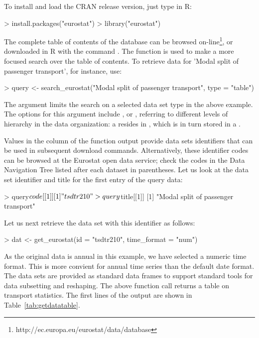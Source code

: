 To install and load the CRAN release version, just type in R:

\begin{example}
> install.packages("eurostat")
> library("eurostat")
\end{example}

The complete table of contents of the database can be browsed
on-line\footnote{http://ec.europa.eu/eurostat/data/database}, or
downloaded in R with the command . The function  is used
to make a more focused search over the table of contents. To retrieve
data for 'Modal split of passenger transport', for instance, use:

\begin{example}
> query <- search_eurostat("Modal split of passenger transport", type = "table")
\end{example}

The  argument limits the search on a selected data set type
in the above example. The options for this argument
include ,  or , referring to
different levels of hierarchy in the data organization: a 
resides in , which is in turn stored in a
.

Values in the  column of the 
function output provide data sets identifiers that can be used in
subsequent download commands. Alternatively, these identifier codes
can be browsed at the Eurostat open data service; check the codes in
the Data Navigation Tree listed after each dataset in parentheses. Let
us look at the data set identifier and title for the first entry of
the query data:

\begin{example}
> query$code[[1]]
[1] "tsdtr210"

> query$title[[1]]
[1] "Modal split of passenger transport"
\end{example}


Let us next retrieve the data set with this identifier as follows:

\begin{example}
> dat <- get_eurostat(id = "tsdtr210", time_format = "num")
\end{example}

As the original data is annual in this example, we have selected a
numeric time format. This is more convient for annual time series than
the default date format. The data sets are provided as standard data
frames to support standard tools for data subsetting and
reshaping. The above function call returns a table on transport
statistics.  The first lines of the output are shown in
Table~\ref{tab:getdatatable}.

